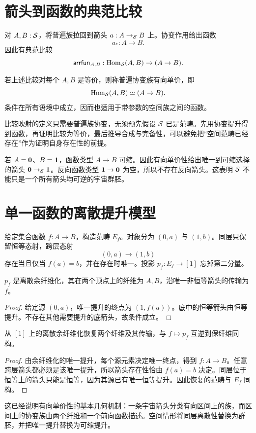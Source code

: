\section{箭头到函数的典范比较}
\begin{definition}
对 $A,B:\mathcal S$，将普遍族拉回到箭头 $a:A\to_\mathcal S B$ 上。协变作用给出函数
\[
a_*:A\to B.
\]
因此有典范比较
\[
\mathsf{arrfun}_{A,B}:\operatorname{Hom}_\mathcal S(A,B)\to(A\to B).
\]
\end{definition}
\begin{definition}[有向单价性]\label{def:directed-univalence}
若上述比较对每个 $A,B$ 是等价，则称普遍协变族有向单价，即
\[
\operatorname{Hom}_\mathcal S(A,B)\simeq(A\to B).
\]
条件在所有语境中成立，因而也适用于带参数的空间族之间的函数。
\end{definition}
\begin{remark}
比较映射的定义只需要普遍族协变，无须预先假设 $\mathcal S$ 已是范畴。先用协变提升得到函数，再证明比较为等价，最后推导合成与完备性，可以避免把“空间范畴已经存在”作为证明自身存在性的前提。
\end{remark}
\begin{example}
若 $A=\mathbf 0$、$B=\mathbf 1$，函数类型 $A\to B$ 可缩。因此有向单价性给出唯一到可缩选择的箭头 $\mathbf 0\to_\mathcal S\mathbf 1$。反向函数类型 $\mathbf 1\to\mathbf 0$ 为空，所以不存在反向箭头。这表明 $\mathcal S$ 不能只是一个所有箭头均可逆的宇宙群胚。
\end{example}

\section{单一函数的离散提升模型}
\begin{definition}[一个函数的元素范畴]
给定集合函数 $f:A\to B$，构造范畴 $E_f$。对象分为 $(0,a)$ 与 $(1,b)$。同层只保留恒等态射，跨层态射
\[
(0,a)\longrightarrow(1,b)
\]
存在当且仅当 $f(a)=b$，并在存在时唯一。投影 $p_f:E_f\to[1]$ 忘掉第二分量。
\end{definition}
\begin{proposition}
$p_f$ 是离散余纤维化，其在两个顶点上的纤维为 $A,B$，沿唯一非恒等箭头的传输为 $f$。
\end{proposition}
\begin{proof}
给定源 $(0,a)$，唯一提升的终点为 $(1,f(a))$。底中的恒等箭头由恒等提升。不存在其他需要提升的底箭头，故条件成立。
\end{proof}
\begin{proposition}[离散的一维分类]
从 $[1]$ 上的离散余纤维化恢复两个纤维及其传输，与 $f\mapsto p_f$ 互逆到保纤维同构。
\end{proposition}
\begin{proof}
由余纤维化的唯一提升，每个源元素决定唯一终点，得到 $f:A\to B$。任意跨层箭头都必须是该唯一提升，所以箭头存在性恰由 $f(a)=b$ 决定。同层位于恒等上的箭头只能是恒等，因为其源已有唯一恒等提升。因此恢复的范畴与 $E_f$ 同构。
\end{proof}
\begin{remark}
这已经说明有向单价性的基本几何机制：一条宇宙箭头分类有向区间上的族，而区间上的协变族由两个纤维和一个前向函数描述。空间情形将同层离散性替换为群胚，并把唯一提升替换为可缩提升。
\end{remark}

